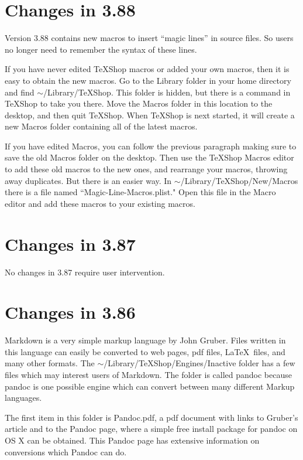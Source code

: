 \documentclass[11pt, oneside]{amsart}
\begin{document}
\section{Changes in 3.88}

Version 3.88 contains new macros to insert ``magic lines'' in source files. So users no longer need to remember the syntax of these lines.

If you have never edited TeXShop macros or added your own macros, then it is easy to obtain the new macros.
Go to the Library folder in your home directory and find $\sim$/Library/TeXShop. This folder is hidden, but there is a command in TeXShop to take you there. Move the Macros folder in this location to the desktop,
and then quit TeXShop. When TeXShop is next started, it will create a new Macros folder containing all of the latest macros.

If you have edited Macros, you can follow the previous paragraph making sure to save the old Macros folder on the desktop. Then use the TeXShop Macros editor to add these old macros to the new ones, and rearrange your macros, throwing away duplicates. But there is an easier way. In $\sim$/Library/TeXShop/New/Macros there is a file named ``Magic-Line-Macros.plist." Open this file in the Macro editor and add these macros to your existing macros.


\section{Changes in 3.87}

No changes in 3.87 require user intervention.

\section{Changes in 3.86}

Markdown is a very simple markup language by John Gruber. Files written in this language can easily be converted to web pages, pdf files, \LaTeX\ files, and many other formats. The $\sim$/Library/TeXShop/Engines/Inactive folder has a few files which may interest users of Markdown. The folder is called pandoc because pandoc is one possible engine which can convert between many different Markup languages. 

The first item in this folder is Pandoc.pdf, a pdf document with links to Gruber's article and to the Pandoc page, where a simple free install package for pandoc on OS X can be obtained. This Pandoc page has extensive information on conversions which Pandoc can do.
\end{document}
